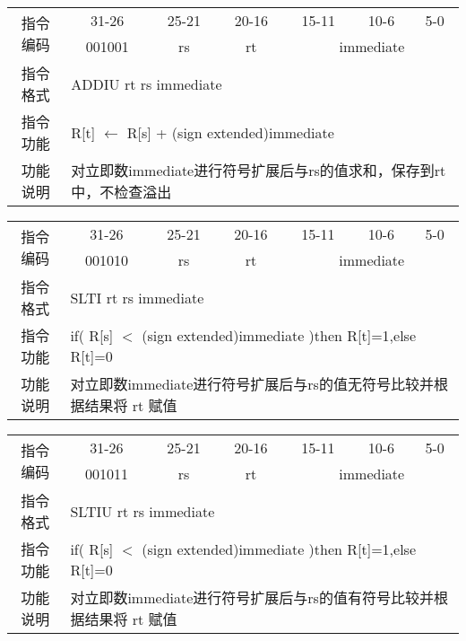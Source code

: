 	\begin{table}[!hbp]
		\centering
		\begin{tabular}{|c|c|c|c|c|c|c|}
		\hline
		\multirow{2}{*}{指令编码} & 31-26&25-21 & 20-16&15-11 &10-6 &5-0\\
		\cline{2-7} & 001001 & rs & rt & \multicolumn{3}{|c|}{immediate} \\
		\hline
		指令格式&\multicolumn{6}{|l|}{ADDIU rt rs immediate}\\
		\hline		
		指令功能&\multicolumn{6}{|l|}{R[t] $\leftarrow$ R[s] + (sign extended)immediate}\\
		\hline		
		功能说明&\multicolumn{6}{|l|}{对立即数immediate进行符号扩展后与rs的值求和，保存到rt中，不检查溢出}\\
		\hline
		\end{tabular}
	\end{table}
	\begin{table}[!hbp]
		\centering
		\begin{tabular}{|c|c|c|c|c|c|c|}
		\hline
		\multirow{2}{*}{指令编码} & 31-26&25-21 & 20-16&15-11 &10-6 &5-0\\
		\cline{2-7} & 001010 & rs & rt & \multicolumn{3}{|c|}{immediate} \\
		\hline
		指令格式&\multicolumn{6}{|l|}{SLTI rt rs immediate}\\
		\hline		
		指令功能&\multicolumn{6}{|l|}{if( R[s] $<$ (sign extended)immediate )then R[t]=1,else R[t]=0}\\
		\hline		
		功能说明&\multicolumn{6}{|l|}{对立即数immediate进行符号扩展后与rs的值无符号比较并根据结果将 rt 赋值}\\
		\hline
		\end{tabular}
	\end{table}
	\begin{table}[!hbp]
		\centering
		\begin{tabular}{|c|c|c|c|c|c|c|}
		\hline
		\multirow{2}{*}{指令编码} & 31-26&25-21 & 20-16&15-11 &10-6 &5-0\\
		\cline{2-7} & 001011 & rs & rt & \multicolumn{3}{|c|}{immediate} \\
		\hline
		指令格式&\multicolumn{6}{|l|}{SLTIU rt rs immediate}\\
		\hline		
		指令功能&\multicolumn{6}{|l|}{if( R[s] $<$ (sign extended)immediate )then R[t]=1,else R[t]=0}\\
		\hline		
		功能说明&\multicolumn{6}{|l|}{对立即数immediate进行符号扩展后与rs的值有符号比较并根据结果将 rt 赋值}\\
		\hline
		\end{tabular}
	\end{table}
\newpage

